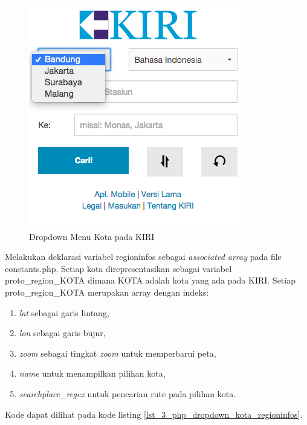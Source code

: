 \documentclass[a4paper,twoside]{article}
\begin{document}
\begin{enumerate}
\begin{figure}[H]
  \centering
  \includegraphics[scale=0.5]{Gambar/KIRI-drop-kota}
  \caption{Dropdown Menu Kota pada KIRI} 
  \label{fig:3_KIRI_drop_kota}
\end{figure}

Melakukan deklarasi variabel regioninfos sebagai \textit{associated array} pada file constants.php. Setiap kota direpresentasikan sebagai variabel proto\_region\_KOTA dimana KOTA adalah kota yang ada pada KIRI. Setiap proto\_region\_KOTA merupakan array dengan indeks:
\begin{enumerate}
	\item \textit{lat} sebagai garis lintang,
	\item \textit{lon} sebagai garis bujur,
	\item \textit{zoom} sebagai tingkat \textit{zoom} untuk memperbarui peta,
	\item \textit{name} untuk menampilkan pilihan kota,
	\item \textit{searchplace\_regex} untuk pencarian rute pada pilihan kota.
\end{enumerate} 
Kode dapat dilihat pada kode listing \ref{lst_3_php_dropdown_kota_regioninfos}.


\end{enumerate}
\end{document}
